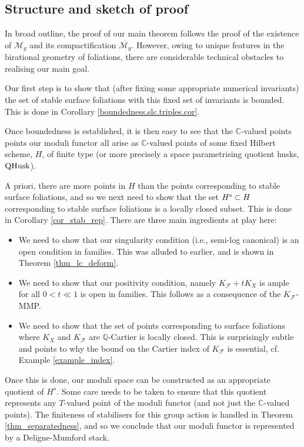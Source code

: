 \documentclass[12pt, a4paper]{amsart}
\newcounter{Theorem}
\theoremstyle{definition}
\theoremstyle{named}
\begin{document}
\subsection{Structure and sketch of proof}

In broad outline, the proof of our main theorem follows the proof of the existence of $\mathcal M_g$ and its compactification $\overline{\mathcal M_g}$.
However, owing to unique features in the birational geometry of foliations, there are considerable technical obstacles to realising our main goal.

Our first step is to show that (after fixing some appropriate numerical invariants) the set of stable surface foliations with this fixed set of invariants is bounded. This is done in Corollary \ref{boundedness.slc.triples.cor}. 

Once boundedness is established, it is then easy to see that the $\mathbb C$-valued points points our moduli functor all arise as $\mathbb C$-valued points of some fixed Hilbert scheme, $H$, of finite type (or more precisely a space parametrising quotient husks, ${\rm QHusk}$). 

A priori, there are more points in $H$ than the points corresponding 
to stable surface foliations, and so we next need to show that the set 
$H^{{\rm s}} \subset H$ corresponding to stable surface foliations is a locally closed subset.  This is done in Corollary \ref{cor_stab_rep}.  There are three main ingredients at play here:
\begin{itemize}
    \item We need to show that our singularity condition (i.e., semi-log canonical) is an open condition in families.  This was alluded to earlier, and is shown in Theorem \ref{thm_lc_deform}.

    \item We need to show that our positivity condition, namely $K_{\mathcal F}+tK_X$ is ample for all $0<t \ll 1$ is open in families.  This follows as a consequence of the $K_{\mathcal F}$-MMP.

    \item We need to show that the set of points corresponding to surface foliations where $K_X$ and $K_{\mathcal F}$ are $\mathbb Q$-Cartier is locally closed.  This is surprisingly subtle and points to why the bound on the Cartier index of $K_{\mathcal F}$ is essential, cf. Example \ref{example_index}.
\end{itemize}

Once this is done, our moduli space can be constructed as an appropriate quotient
of $H^{s}$.  Some care needs to be taken to ensure that this quotient represents any $T$-valued point of the moduli functor (and not just the $\mathbb C$-valued points).  The finiteness of stabilisers for this group action is handled in Theorem \ref{thm_separatedness}, and so we conclude that our moduli functor is represented by a Deligne-Mumford stack.
\end{document}
